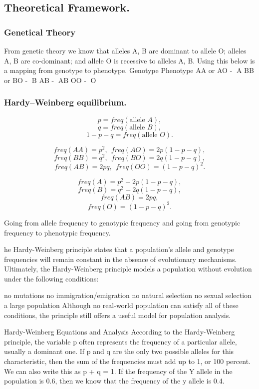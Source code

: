 \documentclass[]{article}
\begin{document}
\subsection{Theoretical Framework.}\label{theoretical-framework.}

\subsubsection{Genetical Theory}\label{genetical-theory}

From genetic theory we know that alleles A, B are dominant to allele O;
alleles A, B are co-dominant; and allele O is recessive to alleles A, B.
Using this below is a mapping from genotype to phenotype. Genotype
Phenotype AA or AO - A BB or BO - B AB - AB OO - O

\subsubsection{Hardy--Weinberg
equilibrium.}\label{hardyweinberg-equilibrium.}

\[p=freq(\mbox{allele } A),\] \[q=freq(\mbox{allele } B),\]
\[1-p-q=freq(\mbox{allele } O).\]

\[freq(AA)=p^2, \: \:  freq(AO)=2p(1-p-q),\]
\[freq(BB)=q^2, \: \: freq(BO)=2q(1-p-q),\]
\[freq(AB)=2pq, \: \: freq(OO)=(1-p-q)^2.\]

\[freq(A)=p^2+2p(1-p-q),\] \[freq(B)=q^2+2q(1-p-q),\] \[freq(AB)=2pq,\]
\[freq(O)=(1-p-q)^2.\]

Going from allele frequency to genotypic frequency and going from
genotypic frequency to phenotypic frequency.

he Hardy-Weinberg principle states that a population's allele and
genotype frequencies will remain constant in the absence of evolutionary
mechanisms. Ultimately, the Hardy-Weinberg principle models a population
without evolution under the following conditions:

no mutations no immigration/emigration no natural selection no sexual
selection a large population Although no real-world population can
satisfy all of these conditions, the principle still offers a useful
model for population analysis.

Hardy-Weinberg Equations and Analysis According to the Hardy-Weinberg
principle, the variable p often represents the frequency of a particular
allele, usually a dominant one. If p and q are the only two possible
alleles for this characteristic, then the sum of the frequencies must
add up to 1, or 100 percent. We can also write this as p + q = 1. If the
frequency of the Y allele in the population is 0.6, then we know that
the frequency of the y allele is 0.4.
\end{document}

